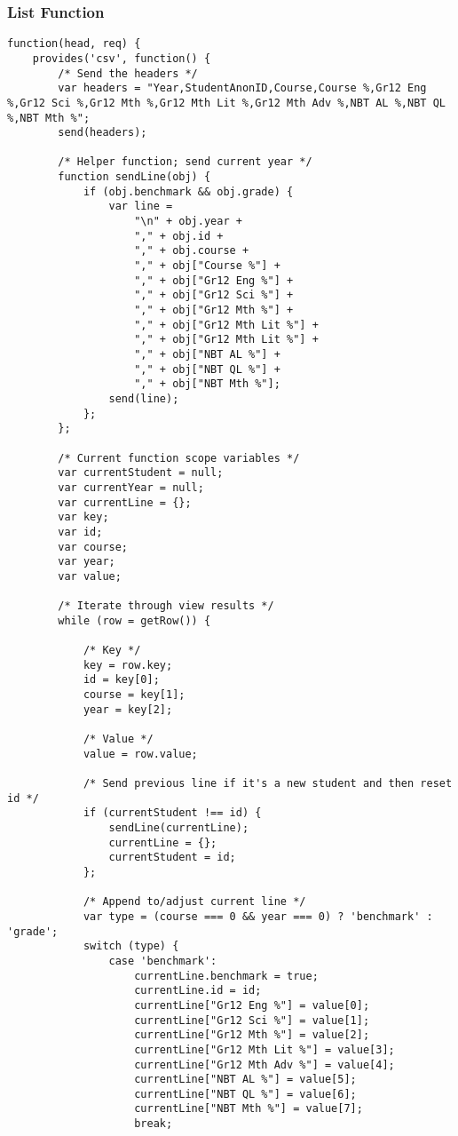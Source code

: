 
\subsubsection{List Function}
\label{2-way-join-list-function}
\begin{verbatim}
function(head, req) {
    provides('csv', function() {
        /* Send the headers */
        var headers = "Year,StudentAnonID,Course,Course %,Gr12 Eng %,Gr12 Sci %,Gr12 Mth %,Gr12 Mth Lit %,Gr12 Mth Adv %,NBT AL %,NBT QL %,NBT Mth %";
        send(headers);

        /* Helper function; send current year */
        function sendLine(obj) {
            if (obj.benchmark && obj.grade) {
                var line =
                    "\n" + obj.year +
                    "," + obj.id +
                    "," + obj.course +
                    "," + obj["Course %"] +
                    "," + obj["Gr12 Eng %"] +
                    "," + obj["Gr12 Sci %"] +
                    "," + obj["Gr12 Mth %"] +
                    "," + obj["Gr12 Mth Lit %"] +
                    "," + obj["Gr12 Mth Lit %"] +
                    "," + obj["NBT AL %"] +
                    "," + obj["NBT QL %"] +
                    "," + obj["NBT Mth %"];
                send(line);
            };
        };

        /* Current function scope variables */
        var currentStudent = null;
        var currentYear = null;
        var currentLine = {};
        var key;
        var id;
        var course;
        var year;
        var value;

        /* Iterate through view results */
        while (row = getRow()) {

            /* Key */
            key = row.key;
            id = key[0];
            course = key[1];
            year = key[2];

            /* Value */
            value = row.value;

            /* Send previous line if it's a new student and then reset id */
            if (currentStudent !== id) {
                sendLine(currentLine);
                currentLine = {};
                currentStudent = id;
            };

            /* Append to/adjust current line */
            var type = (course === 0 && year === 0) ? 'benchmark' : 'grade';
            switch (type) {
                case 'benchmark':
                    currentLine.benchmark = true;
                    currentLine.id = id;
                    currentLine["Gr12 Eng %"] = value[0];
                    currentLine["Gr12 Sci %"] = value[1];
                    currentLine["Gr12 Mth %"] = value[2];
                    currentLine["Gr12 Mth Lit %"] = value[3];
                    currentLine["Gr12 Mth Adv %"] = value[4];
                    currentLine["NBT AL %"] = value[5];
                    currentLine["NBT QL %"] = value[6];
                    currentLine["NBT Mth %"] = value[7];
                    break;


\end{verbatim}
